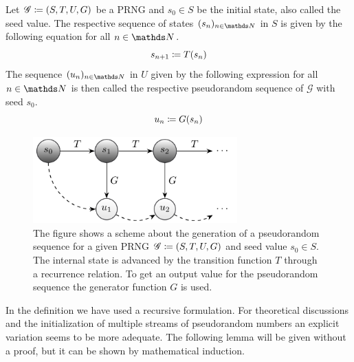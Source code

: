 \documentclass{stdlocal}
\begin{document}
    \begin{definition}
      Let $\mathscr{G}\coloneqq (S,T,U,G)$ be a PRNG and $s_0\in S$ be the initial state, also called the seed value.
      The respective sequence of states $(s_n)_{n\in\setNatural}$ in $S$ is given by the following equation for all $n\in\setNatural$.
      \[
        s_{n+1} \coloneqq T(s_n)
      \]
      The sequence $(u_n)_{n\in\setNatural}$ in $U$ given by the following expression for all $n\in\setNatural$ is then called the respective pseudorandom sequence of $\mathscr{G}$ with seed $s_0$.
      \[
        u_n \coloneqq G(s_n)
      \]
    \end{definition}
    \begin{figure}
      \center
      \includegraphics[width=0.7\textwidth]{figures/sequence_generation_scheme.pdf}
      \caption[Generation of a Pseudorandom Sequence]{%
        The figure shows a scheme about the generation of a pseudorandom sequence for a given PRNG $\mathscr{G}\coloneqq (S,T,U,G)$ and seed value $s_0\in S$.
        The internal state is advanced by the transition function $T$ through a recurrence relation.
        To get an output value for the pseudorandom sequence the generator function $G$ is used.
      }
      \label{fig:scheme-pseudorandom-sequence}
    \end{figure}
    In the definition we have used a recursive formulation.
    For theoretical discussions and the initialization of multiple streams of pseudorandom numbers an explicit variation seems to be more adequate.
    The following lemma will be given without a proof, but it can be shown by mathematical induction.
\end{document}
